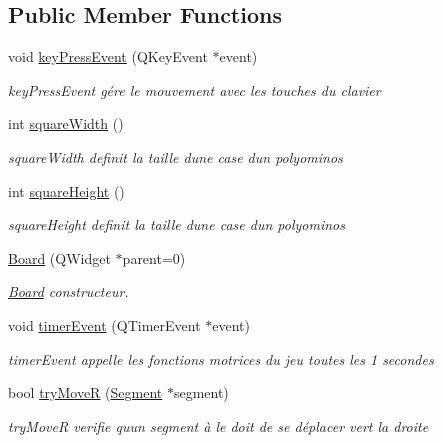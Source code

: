 \subsection*{Public Member Functions}
\begin{DoxyCompactItemize}
\item 
void \hyperlink{class_board_a69e3222342a38b98d4d82522921164ba}{key\+Press\+Event} (Q\+Key\+Event $\ast$event)
\begin{DoxyCompactList}\small\item\em key\+Press\+Event gére le mouvement avec les touches du clavier \end{DoxyCompactList}\item 
int \hyperlink{class_board_af032dd7048b8e3532ffa65889919f23a}{square\+Width} ()
\begin{DoxyCompactList}\small\item\em square\+Width definit la taille d\textquotesingle{}une case d\textquotesingle{}un polyominos \end{DoxyCompactList}\item 
int \hyperlink{class_board_a1a4c3c20cfc820ce5b79d7ab01257890}{square\+Height} ()
\begin{DoxyCompactList}\small\item\em square\+Height definit la taille d\textquotesingle{}une case d\textquotesingle{}un polyominos \end{DoxyCompactList}\item 
\hyperlink{class_board_ace54d4a0f5ccec30c4c86e676299ccbf}{Board} (Q\+Widget $\ast$parent=0)
\begin{DoxyCompactList}\small\item\em \hyperlink{class_board}{Board} constructeur. \end{DoxyCompactList}\item 
void \hyperlink{class_board_a1a44a8a95cb3d04207db592f913db009}{timer\+Event} (Q\+Timer\+Event $\ast$event)
\begin{DoxyCompactList}\small\item\em timer\+Event appelle les fonctions motrices du jeu toutes les 1 secondes \end{DoxyCompactList}\item 
bool \hyperlink{class_board_a4fd044f03afc199a0825635d8485f93f}{try\+MoveR} (\hyperlink{class_segment}{Segment} $\ast$segment)
\begin{DoxyCompactList}\small\item\em try\+MoveR verifie qu\textquotesingle{}un segment à le doit de se déplacer vert la droite \end{DoxyCompactList}\item 

\end{DoxyCompactItemize}

